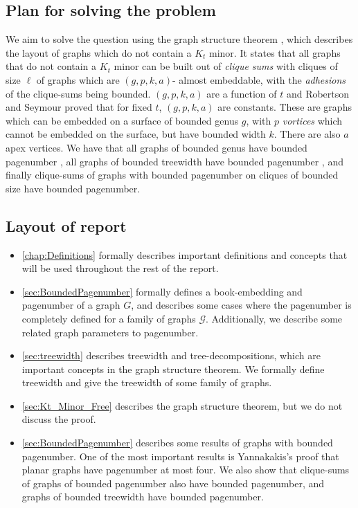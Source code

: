\documentclass[]{report}
\theoremstyle{definition}
\numberwithin{theorem}{section}
\numberwithin{equation}{section}
\begin{document}
\subsection{Plan for solving the problem}
We aim to solve the question using the graph structure theorem \cite{robertsonGraphMinorsXVI2003}, which describes the layout of graphs which do not contain a $K_t$ minor. It states that all graphs that do not contain a $K_t$ minor can be built out of \textit{clique sums} with cliques of size $\ell$ of graphs which are $(g, p, k, a)$- almost embeddable, with the \textit{adhesions} of the clique-sums being bounded. $(g, p, k, a)$ are a function of $t$ and Robertson and Seymour proved that for fixed $t$, $(g, p, k, a)$ are constants. These are graphs which can be embedded on a surface of bounded genus $g$, with $p$ \textit{vortices} which cannot be embedded on the surface, but have bounded width $k$. There are also $a$ apex vertices. We have that all graphs of bounded genus have bounded pagenumber \cite{heathPagenumberGenusGraphs1992}, all graphs of bounded treewidth have bounded pagenumber \cite{ganleyPagenumberTrees2001}, and finally clique-sums of graphs with bounded pagenumber on cliques of bounded size have bounded pagenumber\cite{hickingbothamStackNumberCliqueSum2023}.

\subsection{Layout of report}
\begin{itemize}
	\item \cref{chap:Definitions} formally describes important definitions and concepts that will be used throughout the rest of the report.
	\item \cref{sec:BoundedPagenumber} formally defines a book-embedding and pagenumber of a graph $G$, and describes some cases where the pagenumber is completely defined for a family of graphs $\mathcal{G}$. Additionally, we describe some related graph parameters to pagenumber.
	\item \cref{sec:treewidth} describes treewidth and tree-decompositions, which are important concepts in the graph structure theorem. We formally define treewidth and give the treewidth of some family of graphs. 
	\item \cref{sec:Kt_Minor_Free} describes the graph structure theorem, but we do not discuss the proof.
	\item \cref{sec:BoundedPagenumber} describes some results of graphs with bounded pagenumber. One of the most important results is Yannakakis's proof that planar graphs have pagenumber at most four\cite{yannakakisEmbeddingPlanarGraphs1989b}. We also show that clique-sums of graphs of bounded pagenumber also have bounded pagenumber, and graphs of bounded treewidth have bounded pagenumber.
\end{itemize}
\end{document}
